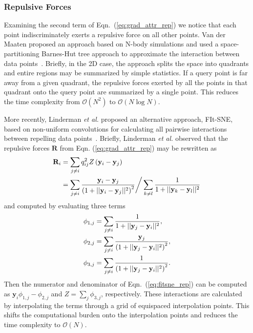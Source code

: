 \documentclass[twocolumn]{bmcart}
\begin{document}
\subsubsection*{Repulsive Forces}

Examining the second term of Eqn.~(\ref{eq:grad_attr_rep}) we notice that each
point indiscriminately exerts a repulsive force on all other points. Van der
Maaten proposed an approach based on N-body simulations and used a
space-partitioning Barnes-Hut tree approach to approximate the interaction
between data points~\cite{van2014accelerating}. Briefly, in the 2D case, the approach splits
the space into quadrants and entire regions may be summarized by simple statistics.
If a query point is far away from a given quadrant, the repulsive forces exerted
by all the points in that quadrant onto the query point are summarized by a single point. This
reduces the time complexity from $\mathcal{O}(N^2)$ to
$\mathcal{O}(N \log N)$.

More recently, Linderman \textit{et al.} proposed an alternative approach,
FIt-SNE, based on non-uniform convolutions for calculating all pairwise
interactions between repelling data points~\cite{linderman2019fast}. Briefly,
Linderman \textit{et al.} observed that the repulsive forces $\mathbf{R}$ from Eqn. (\ref{eq:grad_attr_rep}) may
be rewritten as \begin{align}
\mathbf{R}_i &= \sum_{j \neq i} q_{ij}^2 Z \left ( \mathbf{y}_i - \mathbf{y}_j \right ) \notag \\
&= \sum_{j \neq i} \frac{\mathbf{y}_i - \mathbf{y}_j}{\left ( 1 + || \mathbf{y}_i - \mathbf{y}_j ||^2 \right )^{2}}
\bigg/
\sum_{k \neq l} \frac{1}{1 + || \mathbf{y}_k - \mathbf{y}_l || ^2} \label{eq:fitsne_rep}
\end{align} 
and computed by evaluating three terms
\begin{align}
\phi_{1, j} &= \sum_{j \neq i} \frac{1}{1 + || \mathbf{y}_j - \mathbf{y}_i ||^2}, \notag \\
\phi_{2, j} &= \sum_{j \neq i} \frac{\mathbf{y}_j}{\left( 1 + || \mathbf{y}_j - \mathbf{y}_i ||^2 \right)^2}, \notag \\
\phi_{3, j} &= \sum_{j \neq i} \frac{1}{\left( 1 + || \mathbf{y}_j - \mathbf{y}_i ||^2 \right)^2}. \label{eq:fitsne_terms}
\end{align}
Then the numerator and denominator of Eqn.~(\ref{eq:fitsne_rep}) can be
computed as $\mathbf{y}_i \phi_{1,j} - \phi_{2,j}$ and $Z = \sum_j \phi_{3,j}$,
respectively. These interactions are calculated by interpolating the terms
through a grid of equispaced interpolation points. This shifts the
computational burden onto the interpolation points and reduces the time
complexity to $\mathcal{O}(N)$.
\end{document}
